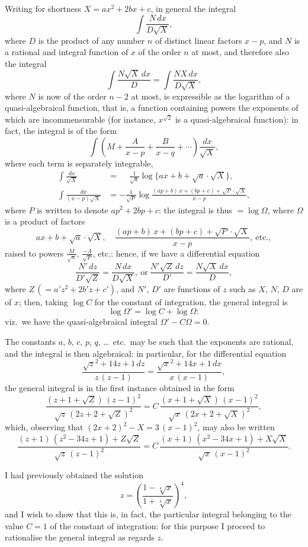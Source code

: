 \documentclass[12pt,a4paper,oneside]{book}
\theoremstyle{plain}
\theoremstyle{definition}
\theoremstyle{remark}
\begin{document}
Writing for shortness $X=ax^2+2bx+c$, in general the integral
\[
\int\!\frac{N\,dx}{D\surd X},
\]
where $D$ is the product of any number $n$ of distinct linear factors $x-p$, and $N$ is a rational and integral function of $x$ of the order $n$ at most, and therefore also the integral
\[
\int\!\frac{N\surd X\,dx}{D}=\int\!\frac{NX\,dx}{D\surd X},
\]
where $N$ is now of the order $n-2$ at most, is expressible as the logarithm of a quasi-algebraical function, that is, a function containing powers the exponents of which are incommensurable (for instance, $x^{\surd 2}$ is a quasi-algebraical function): in fact, the integral is of the form
\[
\int\!\left(M+\frac{A}{x-p}+\frac{B}{x-q}+\cdots\right)\frac{dx}{\surd X},
\]
where each term is separately integrable,
\begin{align*}
\int\!\frac{dx}{\surd X}&=\phantom{-}\frac{1}{\surd a}
  \log\{ax+b+\surd a\cdot\surd X\},\\
\int\!\frac{dx}{(x-p)\surd X}&=-\frac{1}{\surd P}
  \log\frac{(ap+b)\,x+(bp+c)+\surd P\cdot\surd X}{x-p},
\end{align*}
where $P$ is written to denote $ap^2+2bp+c$: the integral is thus $=\log\Omega$, where $\Omega$ is a product of factors
\[
ax+b+\surd a\cdot\surd X,\quad
\frac{(ap+b)\,x+(bp+c)+\surd P\cdot\surd X}{x-p},\ \text{etc.},
\]
raised to powers $\frac{M}{\surd a}$, $\frac{-A}{\surd P}$, etc.: hence, if we have a differential equation
\[
\frac{N'\,dz}{D'\surd Z}=\frac{N\,dx}{D\surd X},\ \text{or}\ 
\frac{N'\surd Z\,dz}{D'}=\frac{N\surd X\,dx}{D},
\]
where $Z\,(=a'z^2+2b'z+c')$, and $N'$, $D'$ are functions of $z$ such as $X$, $N$, $D$ are of $x$; then, taking $\log C$ for the constant of integration, the general integral is
\[
\log\Omega'=\log C+\log\Omega:
\]
viz.\ we have the quasi-algebraical integral $\Omega'-C\Omega=0$.

The constants $a$, $b$, $c$, $p$, $q$, \dots\ etc.\ may be such that the exponents are rational, and the integral is then algebraical: in particular, for the differential equation
\[
\frac{\surd z^2+14z+1\,dz}{z\,(z-1)}
=\frac{\surd x^2+14x+1\,dx}{x\,(x-1)},
\]
the general integral is in the first instance obtained in the form
\[
\frac{(z+1+\surd Z)\,(z-1)^2}{\surd z\,(2z+2+\surd Z)^2}
=C\,\frac{(x+1+\surd X)\,(x-1)^2}{\surd x\,(2x+2+\surd X)^2},
\]
which, observing that $(2x+2)^2-X=3\,(x-1)^2$, may also be written
\[
\frac{(z+1)\,(z^2-34z+1)+Z\surd Z}{\surd z\,(z-1)^2}
=C\,\frac{(x+1)\,(x^2-34x+1)+X\surd X}{\surd x\,(x-1)^2}.
\]

I had previously obtained the solution
\[
z=\left(\frac{1-\sqrt[4]{x}}{1+\sqrt[4]{x}}\right)^4,
\]
and I wish to show that this is, in fact, the particular integral belonging to the value $C=1$ of the constant of integration: for this purpose I proceed to rationalise the general integral as regards $z$.
\end{document}
